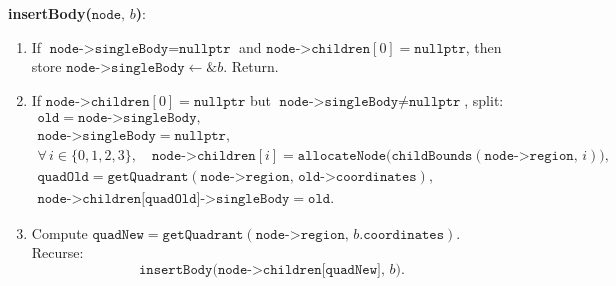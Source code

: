 \documentclass{article}
\begin{document}
\vspace{1ex}
\noindent\textbf{insertBody(\(\texttt{node},\,b\))}: 
\begin{enumerate}
  \item If \(\texttt{node->singleBody} = \texttt{nullptr}\) and \(\texttt{node->children}[0] = \texttt{nullptr}\), then
    store \(\texttt{node->singleBody} \leftarrow \&b\). Return.
  \item If \(\texttt{node->children}[0] = \texttt{nullptr}\) but \(\texttt{node->singleBody} \neq \texttt{nullptr}\), split:
    \[
    \begin{array}{l}
      \texttt{old} = \texttt{node->singleBody},\\
      \texttt{node->singleBody} = \texttt{nullptr},\\
      \forall\,i\in\{0,1,2,3\},\quad 
        \texttt{node->children}[i] 
          = \texttt{allocateNode}\bigl(\texttt{childBounds}(\texttt{node->region},\,i)\bigr),\\
      \texttt{quadOld} 
        = \texttt{getQuadrant}(\texttt{node->region},\,\texttt{old->coordinates}),\\
      \texttt{node->children[quadOld]->singleBody} 
        = \texttt{old}.
    \end{array}
    \]
  \item Compute 
    \(\texttt{quadNew} = \texttt{getQuadrant}(\texttt{node->region},\,b.\texttt{coordinates})\).  
    Recurse:
    \[
      \texttt{insertBody}\bigl(\texttt{node->children[quadNew]},\,b\bigr).
    \]
\end{enumerate}
\end{document}
